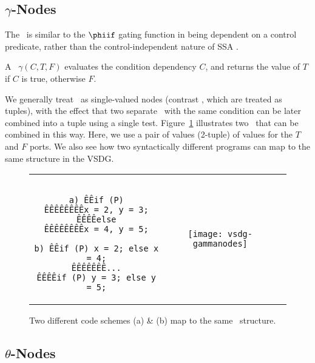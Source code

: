 
\subsection{$\gamma$-Nodes}

The \Gn\ is similar to the $\phiif$ gating function in being dependent on a control predicate, rather than the control-independent nature of SSA \phifuns.
%

A \Gn\ $\gamma(C, T, F)$ evaluates the condition dependency $C$, and returns the value of $T$ if $C$ is true, otherwise $F$.

%
We generally treat \Gns\ as single-valued nodes (contrast \Tns, which are treated as tuples), with the effect that two separate \Gns\ with the same condition can be later combined into a tuple using a single test. 
Figure~\ref{fig:twinPhis} illustrates two \Gns\ that can be combined in this way. 
Here, we use a pair of values (2-tuple) of values for the $T$ and $F$ ports. 
We also see how two syntactically different programs can map to the same structure in the VSDG.

\begin{figure}[!hb]
\centering
\begin{tabular}{ccc}	\cline{1-1}
\begin{minipage}[l]{2.0in}
\begin{verbatim}

a) ÊÊif (P)
ÊÊÊÊÊÊÊÊx = 2, y = 3;
ÊÊÊÊelse
ÊÊÊÊÊÊÊÊx = 4, y = 5;

b) ÊÊif (P) x = 2; else x = 4;
ÊÊÊÊÊÊÊ...
ÊÊÊÊif (P) y = 3; else y = 5;

\end{verbatim}
\end{minipage}	
& \hspace {0.2in}
\begin{minipage}[m][\height][l]{1.6in}
\texttt{[image: vsdg-gammanodes]}
\end{minipage} \\ \cline{1-1}
\end{tabular}

\caption{Two different code schemes (a) \& (b) map to the same
\Gn\ structure.}

\label{fig:twinPhis}
\end{figure}


\subsection{$\theta$-Nodes}

